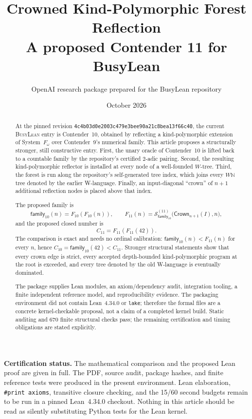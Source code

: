 \documentclass[11pt]{article}
\title{\textbf{Crowned Kind-Polymorphic Forest Reflection}\\[0.35em]
  \large A proposed Contender 11 for BusyLean}
\author{OpenAI research package prepared for the BusyLean repository}
\date{October 2026}
\theoremstyle{definition}
\theoremstyle{remark}
\newcommand{\N}{\mathbb{N}}
\newcommand{\code}[1]{\texttt{#1}}
\newcommand{\Sstage}{\mathcal{S}^{(11)}}
\newcommand{\Crown}{\mathsf{Crown}}
\newcommand{\FamTen}{\mathsf{family}_{10}}
\newcommand{\Feleven}{F_{11}}
\newcommand{\ContEleven}{C_{11}}
\newcommand{\ContTen}{C_{10}}
\newcommand{\repo}{\textsc{BusyLean}}
\newcommand{\pin}{\texttt{4c4b03d0e2003c479e3bee90a21c8bea13f66c40}}
\begin{document}
\maketitle

\begin{abstract}
At the pinned revision \pin, the current \repo{} entry is Contender~10,
obtained by reflecting a kind-polymorphic extension of System~$F_\omega$
over Contender~9's numerical family.  This article proposes a structurally
stronger, still constructive entry.  First, the unary oracle of Contender~10
is lifted back to a countable family by the repository's certified $2$-adic
pairing.  Second, the resulting kind-polymorphic reflector is installed at
every node of a well-founded $W$-tree.  Third, the forest is run along the
repository's self-generated tree index, which joins every $W\N$ tree denoted
by the earlier W-language.  Finally, an input-diagonal ``crown'' of $n+1$
additional reflection nodes is placed above that index.

The proposed family is
\[
  \FamTen(n)=F_{10}(F_{10}(n)),\qquad
  \Feleven(n)=
  \Sstage_{\FamTen}\bigl(\Crown_{n+1}(I),n\bigr),
\]
and the proposed closed number is
\[
  \ContEleven=\Feleven(\Feleven(42)).
\]
The comparison is exact and needs no ordinal calibration:
$\FamTen(n)<\Feleven(n)$ for every $n$, hence
$\ContTen=\FamTen(42)<\ContEleven$.  Stronger structural statements show that
every crown edge is strict, every accepted depth-bounded kind-polymorphic
program at the root is exceeded, and every tree denoted by the old W-language
is eventually dominated.

The package supplies Lean modules, an axiom/dependency audit, integration
tooling, a finite independent reference model, and reproducibility evidence.
The packaging environment did not contain Lean~4.34.0 or \code{lake}; therefore
the formal files are a concrete kernel-checkable proposal, not a claim of a
completed kernel build.  Static auditing and 670 finite structural checks pass;
the remaining certification and timing obligations are stated explicitly.
\end{abstract}

\begin{statusbox}
\textbf{Certification status.}
The mathematical comparison and the proposed Lean proof are given in full.
The PDF, source audit, package hashes, and finite reference tests were produced
in the present environment.  Lean elaboration, \code{\#print axioms}, transitive
closure checking, and the 15/60 second budgets remain to be run in a pinned
Lean~4.34.0 checkout.  Nothing in this article should be read as silently
substituting Python tests for the Lean kernel.
\end{statusbox}
\end{document}
